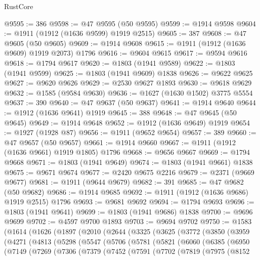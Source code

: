 \begin{lexlean}{RustCore}
\begin{coremodule}
@9595 := 386
@9598 := @47 @9595 (@50 @9595)
@9599 := @1914 @9598
@9604 := @1911 (@1912 (@1636 @9599) @1919 @2515)
@9605 := 387
@9608 := @47 @9605 (@50 @9605)
@9609 := @1914 @9608
@9615 := @1911 (@1912 (@1636 @9609) @1919 @2073) @1796
@9616 := @9604 @9615
@9617 := @9594 @9616
@9618 := @1794 @9617
@9620 := @1803 (@1941 @9589)
@9622 := @1803 (@1941 @9599)
@9625 := @1803 (@1941 @9609) @1838
@9626 := @9622 @9625
@9627 := @9620 @9626
@9629 := @2530 @9627 @1893
@9630 := @9618 @9629
@9632 := @1585 (@9584 @9630)
@9636 := @1627 (@1630 @1502) @3775 @5554
@9637 := 390
@9640 := @47 @9637 (@50 @9637)
@9641 := @1914 @9640
@9644 := @1912 (@1636 @9641) @1919
@9645 := 388
@9648 := @47 @9645 (@50 @9645)
@9649 := @1914 @9648
@9652 := @1912 (@1636 @9649) @1919
@9654 := @1927 (@1928 @87)
@9656 := @1911 (@9652 @9654)
@9657 := 389
@9660 := @47 @9657 (@50 @9657)
@9661 := @1914 @9660
@9667 := @1911 (@1912 (@1636 @9661) @1919 @1805) @1796
@9668 := @9656 @9667
@9669 := @1794 @9668
@9671 := @1803 (@1941 @9649)
@9674 := @1803 (@1941 @9661) @1838
@9675 := @9671 @9674
@9677 := @2420 @9675 @2216
@9679 := @2371 (@9669 @9677)
@9681 := @1911 (@9644 @9679)
@9682 := 391
@9685 := @47 @9682 (@50 @9682)
@9686 := @1914 @9685
@9692 := @1911 (@1912 (@1636 @9686) @1919 @2515) @1796
@9693 := @9681 @9692
@9694 := @1794 @9693
@9696 := @1803 (@1941 @9641)
@9699 := @1803 (@1941 @9686) @1838
@9700 := @9696 @9699
@9702 := @4597 @9700 @1893
@9703 := @9694 @9702
@9750 := @1583
    (@1614
      (@1626
        (@1897
          (@2010
            (@2644
              (@3325
                (@3625
                  (@3772
                    (@3850
                      (@3959
                        (@4271
                          (@4813
                            (@5298
                              (@5547
                                (@5706
                                  (@5781
                                    (@5821
                                      (@6060
                                        (@6385
                                          (@6950
                                            (@7149
                                              (@7269
                                                (@7306
                                                  (@7379
                                                    (@7452
                                                      (@7591
                                                        (@7702
                                                          (@7819
                                                            (@7975
                                                              (@8152

\end{coremodule}
\end{lexlean}
